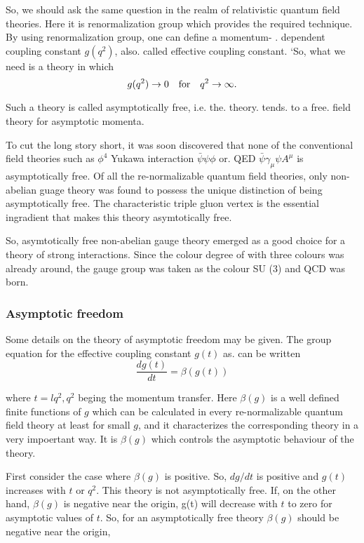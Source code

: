 So, we should ask the same question in the realm of relativistic quantum
field theories. Here it is renormalization group which provides the required
technique. By using renormalization group, one can define a momentum- .
dependent coupling constant $g(q^{2})$, also. called effective coupling constant.
‘So, what we need is a theory in which 
$$
g(q^{2}) \rightarrow 0 \quad {\rm for}\quad q^{2} \rightarrow \infty.
$$

Such a theory is called {\rm asymptotically free}, i.e. the.
theory. tends. to a free. field theory for asymptotic
momenta. 

To cut the long story short, it was soon discovered
that none of the conventional field theories such as
$\phi^{4}$ Yukawa interaction $\bar{\psi}\psi\phi$ or. QED $\bar{\psi}\gamma_{\mu} \psi A^{\mu}$ is
asymptotically free. Of all the re-normalizable
quantum field theories, only non-abelian guage theory
was found to possess the unique distinction of being
asymptotically free. The characteristic triple gluon 
vertex is the essential ingradient that makes this theory asymtotically free.

So, asymtotically free non-abelian gauge theory emerged as a good
choice for a theory of strong interactions. Since the colour degree of
with three colours was already around, the gauge group was taken as the colour SU (3) and QCD was born.  

\subsubsection*{Asymptotic freedom}

Some details on the theory of asymptotic freedom may be given. The
group equation for the effective coupling constant $g(t)$ as. can be written
$$
\frac{dg(t)}{dt}= \beta(g(t))
$$

where $t=l q^{2}, q^{2}$ beging the momentum transfer. Here $\beta(g)$ is a well defined finite functions of $g$ which can be calculated in every re-normalizable quantum field theory at least for small $g$, and it characterizes the corresponding theory in a very impoertant way. It is $\beta(g)$ which controls the asymptotic behaviour of the theory.

First consider the case where $\beta(g)$ is positive. So, $dg/dt$ is positive and $g(t)$ increases with $t$ or $q^{2}$. This theory is not asymptotically free. If, on the other
hand, $\beta (g)$ is negative near the origin, g(t) will decrease with $t$ to zero for asymptotic values of $t$. So, for an asymptotically free theory $\beta (g)$ should be negative near the origin, 

